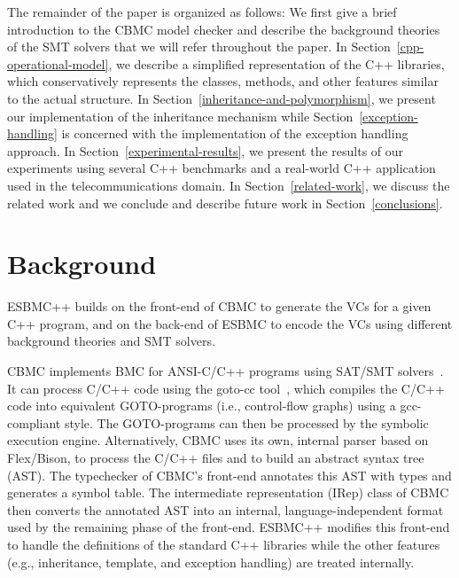 \documentclass[conference]{IEEEtran}
\begin{document}
The remainder of the paper is organized as follows: We first give a brief 
introduction to the CBMC model checker and describe the background 
theories of the SMT solvers that we will refer throughout the paper. 
In Section~\ref{cpp-operational-model}, we describe a simplified representation of the C++
libraries, which conservatively represents the classes, methods, and other features 
similar to the actual structure. In Section~\ref{inheritance-and-polymorphism}, we present
our implementation of the inheritance mechanism while Section~\ref{exception-handling} 
is concerned with the implementation of the exception handling approach.
In Section~\ref{experimental-results}, we present the results of our experiments using 
several C++ benchmarks and a real-world C++ application used in the telecommunications domain. 
In Section~\ref{related-work}, we discuss the related work and we conclude and describe 
future work in Section~\ref{conclusions}.

\section{Background}

ESBMC++ builds on the front-end of CBMC to generate the VCs for a given C++ program,
and on the back-end of ESBMC to encode the VCs using different background theories
and SMT solvers.

\smallskip{}
\label{sec:C-Bounded-Model-Checker}
%
CBMC implements BMC for ANSI-C/C++ programs using SAT/SMT
solvers~\cite{Clarke04}.  It can process C/C++ code using the goto-cc
tool~\cite{Wintersteiger09}, which compiles the C/C++ code into
equivalent GOTO-programs (i.e., control-flow graphs) using a
gcc-compliant style. The GOTO-programs can then be processed by the
symbolic execution engine. Alternatively, CBMC uses its own, internal
parser based on Flex/Bison, to process the C/C++ files and to build an
abstract syntax tree (AST). The typechecker of CBMC's front-end
annotates this AST with types and generates a symbol table. The intermediate
representation (IRep) class of CBMC then converts the annotated AST into an internal,
language-independent format used by the remaining phase of the
front-end.  ESBMC++ modifies this front-end to handle the definitions of
the standard C++ libraries while the other features (e.g., inheritance,
template, and exception handling) are treated internally.
\end{document}
